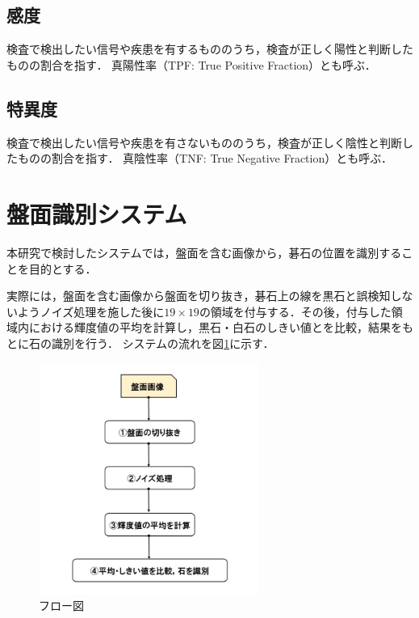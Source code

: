 \documentclass[openright]{nitocs}
\numberwithin{equation}{section}
\begin{document}
        \subsection{感度} %
        検査で検出したい信号や疾患を有するもののうち，検査が正しく陽性と判断したものの割合を指す．
        真陽性率（TPF: True Positive Fraction）とも呼ぶ．

        \subsection{特異度} %
        検査で検出したい信号や疾患を有さないもののうち，検査が正しく陰性と判断したものの割合を指す．
        真陰性率（TNF: True Negative Fraction）とも呼ぶ．

    \section{盤面識別システム} %
        本研究で検討したシステムでは，盤面を含む画像から，碁石の位置を識別することを目的とする．

        実際には，盤面を含む画像から盤面を切り抜き，碁石上の線を黒石と誤検知しないようノイズ処理を施した後に$19\times19$の領域を付与する．その後，付与した領域内における輝度値の平均を計算し，黒石・白石のしきい値とを比較，結果をもとに石の識別を行う．
        システムの流れを図\ref{flow}に示す．
        \begin{figure}[tb] %
            \begin{center}
            \includegraphics[width=72mm,height=75.6mm]{flow.jpg} 
            \caption{フロー図}
            \label{flow}
            \end{center}
        \end{figure}
\end{document}
